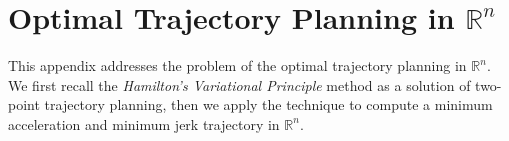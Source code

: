 \chapter{Optimal Trajectory Planning in $\mathbb{R}^n$} 

This appendix addresses the problem of the optimal trajectory planning in $\mathbb{R}^n$. We first recall the \emph{Hamilton's Variational Principle} method as a solution of two-point trajectory planning, then we apply the technique to compute a minimum acceleration and minimum jerk trajectory in $\mathbb{R}^n$.



